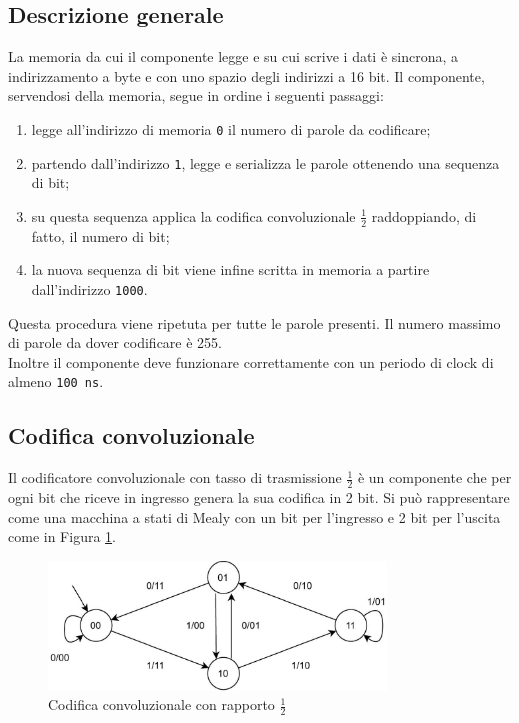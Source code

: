 \documentclass{article}
\begin{document}
\subsection{Descrizione generale}
La memoria da cui il componente legge e su cui scrive i dati è sincrona, a indirizzamento a byte e con uno spazio degli indirizzi a 16 bit. Il componente, servendosi della memoria, segue in ordine i seguenti passaggi:
\vspace{3.5pt}
\begin{enumerate}
    \item legge all'indirizzo di memoria \verb|0| il numero di parole da codificare;
    \item partendo dall'indirizzo \verb|1|, legge e serializza le parole ottenendo una sequenza di bit;
    \item su questa sequenza applica la codifica convoluzionale \(\frac{1}{2}\) raddoppiando, di fatto, il numero di bit;
    \item la nuova sequenza di bit viene infine scritta in memoria a partire dall'indirizzo \verb|1000|.
\end{enumerate}
\vspace{5pt}
Questa procedura viene ripetuta per tutte le parole presenti. Il numero massimo di parole da dover codificare è 255.\\
Inoltre il componente deve funzionare correttamente con un periodo di clock di almeno \verb|100 ns|.

\subsection{Codifica convoluzionale}
Il codificatore convoluzionale con tasso di trasmissione \(\frac{1}{2}\) è un componente che per ogni bit che riceve in ingresso genera la sua codifica in 2 bit. Si può rappresentare come una macchina a stati di Mealy con un bit per l’ingresso e 2 bit per l’uscita come in Figura \ref{fig:Cod_Conv}.

\begin{figure}[h]
    \vspace{15pt}
    \centering
    \includegraphics[width=0.8\textwidth]{Resources/Cod_Conv.jpg}
    \caption{Codifica convoluzionale con rapporto \(\frac{1}{2}\)}
    \label{fig:Cod_Conv}
    \vspace{5pt}
\end{figure}
\pagebreak
\end{document}
